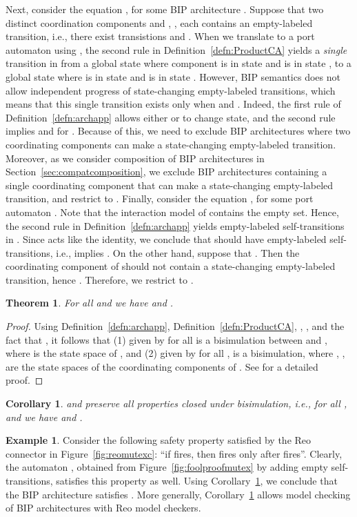 \documentclass[submission,copyright,creativecommons,hidelinks]{eptcs}
\theoremstyle{plain} \newtheorem{theorem}{Theorem}
\newtheorem{corollary}{Corollary}
\theoremstyle{definition}
\newtheorem{example}{Example}
\theoremstyle{remark}
\newcommand\xqed[1]{\leavevmode\unskip\penalty9999 \hbox{}\nobreak\hfill
  \quad\hbox{#1}}
\newcommand\tri{\xqed{}}
\newcommand{\defn}[1]{Definition~\ref{defn:#1}}
\newcommand{\fig}[2][]{Figure~\ref{fig:#2}\ensuremath{#1}}
\newcommand{\secn}[1]{Section~\ref{sec:#1}}
\newcommand{\cor}[1]{Corollary~\ref{cor:#1}}
\begin{document}
Next, consider the equation , for some BIP architecture . Suppose that two distinct coordination components  and , , each contains an empty-labeled transition, i.e., there exist transistions  and . When we translate  to a port automaton using , the second rule in \defn{ProductCA} yields a \emph{single} transition in  from a global state where component  is in state  and  is in state , to a global state where  is in state  and  is in state . However, BIP semantics does not allow independent progress of state-changing empty-labeled transitions, which means that this single transition exists only when  and . Indeed, the first rule of \defn{archapp} allows either  or  to change state, and the second rule implies  and  for . Because of this, we need to exclude BIP architectures where two coordinating components can make a state-changing empty-labeled transition. Moreover, as we consider composition of BIP architectures in \secn{compatcomposition}, we exclude BIP architectures containing a single coordinating component that can make a state-changing empty-labeled transition, and restrict  to 
.
Finally, consider the equation , for some port automaton . Note that the interaction model of  contains the empty set. Hence, the second rule in \defn{archapp} yields empty-labeled self-transitions in . Since  acts like the identity, we conclude that  should have empty-labeled self-transitions, i.e.,  implies . On the other hand, suppose that . Then the coordinating component of  should not contain a state-changing empty-labeled transition, hence . Therefore, we restrict  to .

\begin{theorem}
\label{thm:commute_a} 
For all  and  we have  and .
\end{theorem}

\begin{proof}
Using \defn{archapp}, \defn{ProductCA}, , , and the fact that , it follows that (1)  given by  for all  is a bisimulation between  and , where  is the state space of , and (2)  given by  for all , is a bisimulation, where , , are the state spaces of the coordinating components of . 
See \cite{bip2reo} for a detailed proof.
\end{proof}

\begin{corollary}
\label{cor:props_pa2arch}
 and  preserve all properties closed under bisimulation, i.e., for all ,  and  we have  and .
\end{corollary}

\begin{example}
	Consider the following safety property  satisfied by the Reo connector in \fig{reomutexc}: ``if  fires, then  fires only after  fires''. Clearly, the automaton , obtained from \fig{foolproofmutex} by adding empty self-transitions, satisfies this property as well. Using \cor{props_pa2arch}, we conclude that the BIP architecture  satisfies . More generally, \cor{props_pa2arch} allows model checking of BIP architectures with Reo model checkers. 
\tri\end{example}
\end{document}
